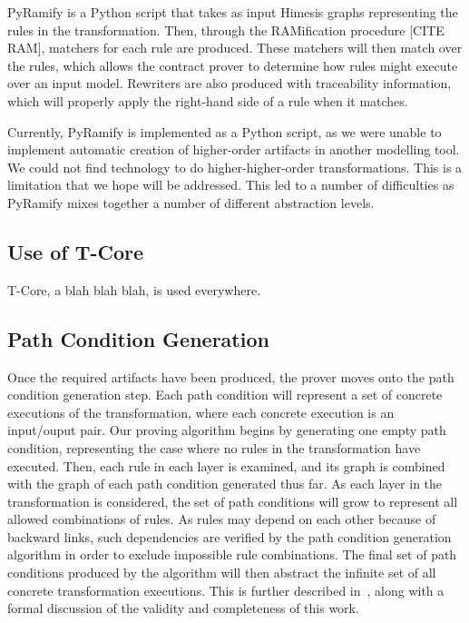PyRamify is a Python script that takes as input Himesis graphs representing the rules in the transformation. Then, through the RAMification procedure [CITE RAM], matchers for each rule are produced. These matchers will then match over the rules, which allows the contract prover to determine how rules might execute over an input model. Rewriters are also produced with traceability information, which will properly apply the right-hand side of a rule when it matches.

Currently, PyRamify is implemented as a Python script, as we were unable to implement automatic creation of higher-order artifacts in another modelling tool. We could not find technology to do higher-higher-order transformations. This is a limitation that we hope will be addressed. This led to a number of difficulties as PyRamify mixes together a number of different abstraction levels. 

\subsection{Use of T-Core}

T-Core, a blah blah blah, is used everywhere.


\subsection{Path Condition Generation}

Once the required artifacts have been produced, the prover moves onto the path condition generation step.  Each
path condition will represent a set of concrete executions
of the transformation, where each concrete execution is an
input/ouput pair.
Our proving algorithm begins by generating one empty
path condition, representing the case where no rules in the
transformation have executed. Then, each rule in each layer
is examined, and its graph is combined with the graph of
each path condition generated thus far. As each layer in the
transformation is considered, the set of path conditions will
grow to represent all allowed combinations of rules. As rules
may depend on each other because of backward links, such
dependencies are verified by the path condition generation
algorithm in order to exclude impossible rule combinations.
The final set of path conditions produced by the algorithm
will then abstract the infinite set of all concrete transformation
executions. This is further described in~\cite{Lucio2014}, along with a
formal discussion of the validity and completeness of this
work.

